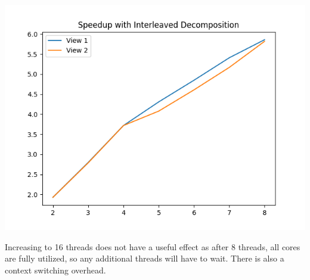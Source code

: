 \documentclass{article}
\begin{document}
\includegraphics[width=1\textwidth]{speedup_interleaved.png}

Increasing to 16 threads does not have a useful effect as after 8 threads, all
cores are fully utilized, so any additional threads will have to wait. There is
also a context switching overhead.
\end{document}
